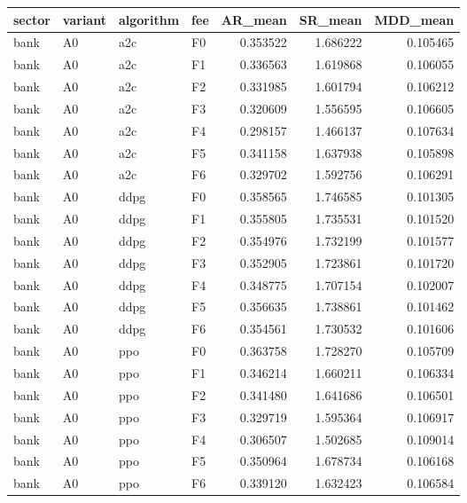 \begin{tabular}{llllrrr}
\toprule
    sector & variant & algorithm & fee &   AR\_mean &   SR\_mean &  MDD\_mean \\
\midrule
      bank &      A0 &       a2c &  F0 &  0.353522 &  1.686222 &  0.105465 \\
      bank &      A0 &       a2c &  F1 &  0.336563 &  1.619868 &  0.106055 \\
      bank &      A0 &       a2c &  F2 &  0.331985 &  1.601794 &  0.106212 \\
      bank &      A0 &       a2c &  F3 &  0.320609 &  1.556595 &  0.106605 \\
      bank &      A0 &       a2c &  F4 &  0.298157 &  1.466137 &  0.107634 \\
      bank &      A0 &       a2c &  F5 &  0.341158 &  1.637938 &  0.105898 \\
      bank &      A0 &       a2c &  F6 &  0.329702 &  1.592756 &  0.106291 \\
      bank &      A0 &      ddpg &  F0 &  0.358565 &  1.746585 &  0.101305 \\
      bank &      A0 &      ddpg &  F1 &  0.355805 &  1.735531 &  0.101520 \\
      bank &      A0 &      ddpg &  F2 &  0.354976 &  1.732199 &  0.101577 \\
      bank &      A0 &      ddpg &  F3 &  0.352905 &  1.723861 &  0.101720 \\
      bank &      A0 &      ddpg &  F4 &  0.348775 &  1.707154 &  0.102007 \\
      bank &      A0 &      ddpg &  F5 &  0.356635 &  1.738861 &  0.101462 \\
      bank &      A0 &      ddpg &  F6 &  0.354561 &  1.730532 &  0.101606 \\
      bank &      A0 &       ppo &  F0 &  0.363758 &  1.728270 &  0.105709 \\
      bank &      A0 &       ppo &  F1 &  0.346214 &  1.660211 &  0.106334 \\
      bank &      A0 &       ppo &  F2 &  0.341480 &  1.641686 &  0.106501 \\
      bank &      A0 &       ppo &  F3 &  0.329719 &  1.595364 &  0.106917 \\
      bank &      A0 &       ppo &  F4 &  0.306507 &  1.502685 &  0.109014 \\
      bank &      A0 &       ppo &  F5 &  0.350964 &  1.678734 &  0.106168 \\
      bank &      A0 &       ppo &  F6 &  0.339120 &  1.632423 &  0.106584 \\

\end{tabular}
